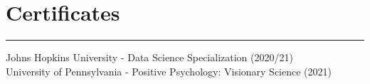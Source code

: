 \documentclass[]{meetresume-class}
\begin{document}
\begin{minipage}[t]{0.33\textwidth}
		\section{Certificates}
		\noindent\rule{5cm}{0.6pt}
		
		Johns Hopkins University - Data Science Specialization (2020/21)\\
		University of Pennsylvania - Positive Psychology: Visionary Science (2021)\\
		
	\end{minipage} 
	\hfill
\end{document}
